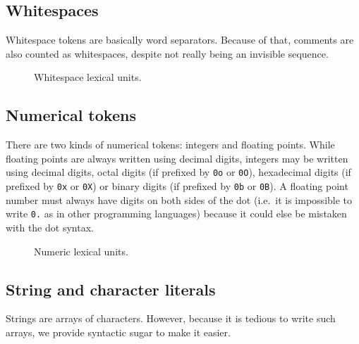 \subsection{Whitespaces}\label{subsec:zilch-grammar-lexical-whitespaces}

Whitespace tokens are basically word separators.
Because of that, comments are also counted as whitespaces, despite not really being an invisible sequence.

\begin{figure}[H]
  \centering


  \caption{Whitespace lexical units.}
  \label{fig:zilch-grammar-lexical-whitespaces-grammar}
\end{figure}

\subsection{Numerical tokens}\label{subsec:zilch-grammar-lexical-numbers}

There are two kinds of numerical tokens: integers and floating points.
While floating points are always written using decimal digits, integers may be written using decimal digits, octal digits (if prefixed by \verb|0o| or \verb|0O|), hexadecimal digits (if prefixed by \verb|0x| or \verb|0X|) or binary digits (if prefixed by \verb|0b| or \verb|0B|).
A floating point number must always have digits on both sides of the dot (i.e.\ it is impossible to write \verb|0.| as in other programming languages) because it could else be mistaken with the dot syntax.

\begin{figure}[H]
  \centering


  \caption{Numeric lexical units.}
  \label{fig:zilch-grammar-lexical-numbers-grammar}
\end{figure}

\subsection{String and character literals}\label{subsec:zilch-grammar-lexical-strings}

Strings are arrays of characters.
However, because it is tedious to write such arrays, we provide syntactic sugar to make it easier.

